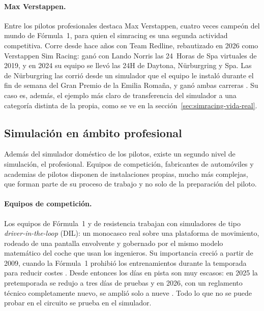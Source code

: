 \paragraph{Max Verstappen.}
Entre los pilotos profesionales destaca Max Verstappen, cuatro veces campeón del mundo de Fórmula~1, para quien el simracing es una segunda actividad competitiva. Corre desde hace años con Team Redline, rebautizado en 2026 como Verstappen Sim Racing: ganó con Lando Norris las 24~Horas de Spa virtuales de 2019, y en 2024 su equipo se llevó las 24H de Daytona, Nürburgring y Spa. Las de Nürburgring las corrió desde un simulador que el equipo le instaló durante el fin de semana del Gran Premio de la Emilia Romaña, y ganó ambas carreras \parencite{traxion_news}. Su caso es, además, el ejemplo más claro de transferencia del simulador a una categoría distinta de la propia, como se ve en la sección~\ref{sec:simracing-vida-real}.

\subsection{Simulación en ámbito profesional}
\label{sec:simracing-equipos}
Además del simulador doméstico de los pilotos, existe un segundo nivel de simulación, el profesional. Equipos de competición, fabricantes de automóviles y academias de pilotos disponen de instalaciones propias, mucho más complejas, que forman parte de su proceso de trabajo y no solo de la preparación del piloto.

\paragraph{Equipos de competición.}
Los equipos de Fórmula~1 y de resistencia trabajan con simuladores de tipo \textit{driver-in-the-loop} (DIL): un monocasco real sobre una plataforma de movimiento, rodeado de una pantalla envolvente y
gobernado por el mismo modelo matemático del coche que usan los ingenieros. Su importancia creció a partir de 2009, cuando la Fórmula~1 prohibió los entrenamientos durante la temporada para reducir
costes \parencite{formula1_news}. Desde entonces los días en pista son muy escasos: en 2025 la pretemporada se redujo a tres días de pruebas y en 2026, con un reglamento técnico completamente nuevo, se amplió solo
a nueve \parencite{formula1_news}. Todo lo que no se puede probar en el circuito se prueba en el simulador.

